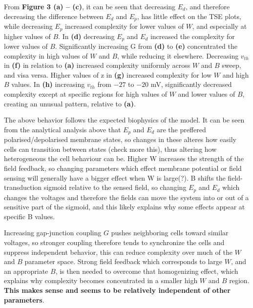 \documentclass{article}
\begin{document}
\begin{flushleft}
\hfill\break
\hfill\break
From \textbf{Figure 3 (a) -- (c)}, it can be seen that decreasing $E_d$, and therefore decreasing the difference between $E_d$ and $E_p$, has little effect on the TSE plots, while decreasing $E_p$ increased complexity for lower values of $W$, and especially at higher values of $B$. In \textbf{(d)} decreasing $E_p$ and $E_d$ increased the complexity for lower values of $B$. Significantly increasing G from \textbf{(d)} to \textbf{(e)} concentrated the complexity in high values of $W$ and $B$, while reducing it elsewhere. Decreasing $v_{th}$ in \textbf{(f)} in relation to \textbf{(a)} increased complexity uniformly across $W$ and $B$ sweep, and visa versa. Higher values of z in \textbf{(g)} increased complexity for low $W$ and high $B$ values. In \textbf{(h)} increasing $v_{th}$ from $-27$ to $-20$ mV, significantly decreased complexity except at specific regions for high values of $W$ and lower values of $B$, creating an unusual pattern, relative to \textbf{(a)}. 

The above behavior follows the expected biophysics of the model. 
It can be seen from the analytical analysis above that $E_p$ and $E_d$ are the preffered polarised/depolarised membrane states, so changes in these alteres how easily cells can transition between states (check more this), thus altering how heterogeneous the cell behaviour can be.  
Higher W increases the strength of the field feedback, so changing parameters which effect membrane potential or field sensing will generally have a bigger effect when W is large(?).  
B shifts the field-transduction sigmoid relative to the sensed field, so changing  $E_p$ and $E_d$ which changes the voltages and therefore the fields can move the system into or out of a sensitive part of the sigmoid, and this likely explains why some effects appear at specific B values. 

Increasing gap-junction coupling $G$ pushes neighboring cells toward similar voltages, so stronger coupling therefore tends to synchronize the cells and suppress independent behavior, this can reduce complexity over much of the $W$ and $B$ parameter space. Strong field feedback which corresponds to large $W$, and an appropriate $B$, is then needed to overcome that homogenizing effect, which explains why complexity becomes concentrated in a smaller high $W$ and $B$ region. \textbf{This makes sense and seems to be relatively independent of other parameters}.


\end{flushleft}
\end{document}
